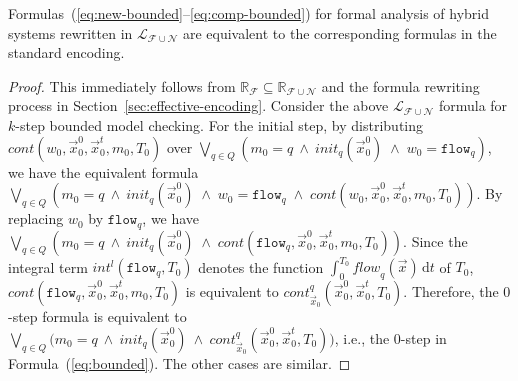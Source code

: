 \begin{theorem}
Formulas~(\ref{eq:new-bounded}--\ref{eq:comp-bounded})
for formal analysis of hybrid systems rewritten in $\mathcal{L}_{\mathcal{F}\cup\mathcal{N}}$ 
are equivalent to the corresponding formulas in the standard encoding.%


\end{theorem}

\begin{proof}
This immediately follows from 
$\mathbb{R}_\mathcal{F} \subseteq \mathbb{R}_{\mathcal{F}\cup\mathcal{N}}$ and
the formula rewriting process in Section~\ref{sec:effective-encoding}.
Consider the above 
$\mathcal{L}_{\mathcal{F}\cup\mathcal{N}}$ formula for $k$-step bounded model checking.
For the initial step, by distributing %
$\mathit{cont}(w_0, \vec{x}_0^0, \vec{x}_0^t, m_0, T_0)$
over %
$\bigvee_{q \in Q}
(m_0 = q 
\:\wedge\:
\mathit{init}_q(\vec{x}_0^0) 
\;\wedge\;
w_0 = \texttt{flow}_q)$,
we have the equivalent formula
$\bigvee_{q \in Q}
(m_0 = q 
\:\wedge\:
\mathit{init}_q(\vec{x}_0^0) 
\;\wedge\;
w_0 = \texttt{flow}_q
\;\wedge\;
\mathit{cont}(w_0, \vec{x}_0^0, \vec{x}_0^t, m_0, T_0))$.
By replacing %
$w_0$ by $\texttt{flow}_q$, we have
$\bigvee_{q \in Q}
(m_0 = q 
\:\wedge\:
\mathit{init}_q(\vec{x}_0^0) 
\;\wedge\;
\mathit{cont}(\texttt{flow}_q, \vec{x}_0^0, \vec{x}_0^t, m_0, T_0))$.
%
Since the integral term $\mathit{int}^l(\texttt{flow}_q, T_0)$
denotes the function $\int_0^{T_0} \mathit{flow}_q(\vec{x})\,\mathrm{d}t$ of $T_0$,
 $\mathit{cont}(\texttt{flow}_q, \vec{x}_0^0, \vec{x}_0^t, m_0, T_0)$
is equivalent to $\mathit{cont}_{\vec{x}_0}^q(\vec{x}_0^0, \vec{x}_0^t, T_0)$.
Therefore,
the $0$-step formula
is equivalent to
$\bigvee_{q \in Q}
\big(
m_0 = q 
\:\wedge\:
\mathit{init}_q(\vec{x}_0^0) 
\:\wedge\:
\mathit{cont}_{\vec{x}_0}^q(\vec{x}_0^0, \vec{x}_0^t, T_0)\big)$,
i.e., the $0$-step in Formula~(\ref{eq:bounded}).
The other cases are similar.
\end{proof}









